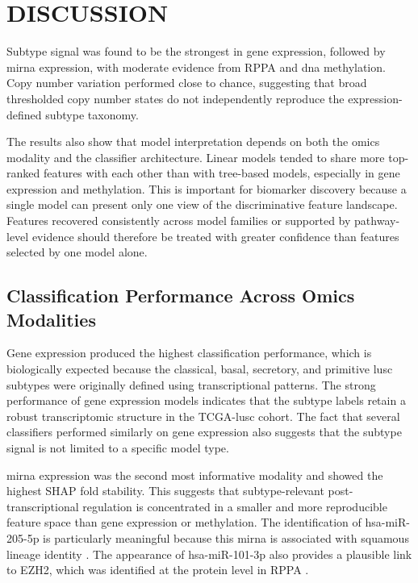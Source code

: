 \chapter{DISCUSSION}

Subtype signal was found to be the strongest in gene expression, followed by \gls{mirna} expression, with moderate evidence from RPPA and \gls{dna} methylation. Copy number variation performed close to chance, suggesting that broad thresholded copy number states do not independently reproduce the expression-defined subtype taxonomy.

The results also show that model interpretation depends on both the omics modality and the classifier architecture. Linear models tended to share more top-ranked features with each other than with tree-based models, especially in gene expression and methylation. This is important for biomarker discovery because a single model can present only one view of the discriminative feature landscape. Features recovered consistently across model families or supported by pathway-level evidence should therefore be treated with greater confidence than features selected by one model alone.

\section{Classification Performance Across Omics Modalities}

Gene expression produced the highest classification performance, which is biologically expected because the classical, basal, secretory, and primitive \gls{lusc} subtypes were originally defined using transcriptional patterns. The strong performance of gene expression models indicates that the subtype labels retain a robust transcriptomic structure in the TCGA-\gls{lusc} cohort. The fact that several classifiers performed similarly on gene expression also suggests that the subtype signal is not limited to a specific model type.

\gls{mirna} expression was the second most informative modality and showed the highest SHAP fold stability. This suggests that subtype-relevant post-transcriptional regulation is concentrated in a smaller and more reproducible feature space than gene expression or methylation. The identification of hsa-miR-205-5p is particularly meaningful because this \gls{mirna} is associated with squamous lineage identity \parencite{Lebanony2009}. The appearance of hsa-miR-101-3p also provides a plausible link to EZH2, which was identified at the protein level in RPPA \parencite{Varambally2008, Montani2024}.

